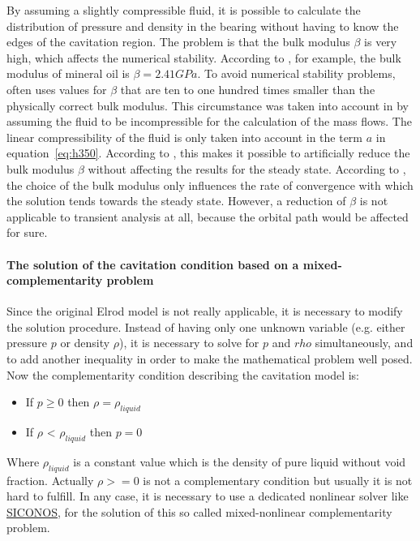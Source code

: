 By assuming a slightly compressible fluid, it is possible to calculate the distribution of pressure and density in the bearing without having to know the edges of the cavitation region. The problem is that the bulk modulus $\beta$ is very high, which affects the numerical stability. According to \cite{Luis-San-Andres-2010}, for example, the bulk modulus of mineral oil is $\beta=2.41GPa$. To avoid numerical stability problems, \cite{Luis-San-Andres-2010} often uses values for $\beta$ that are ten to one hundred times smaller than the physically correct bulk modulus. This circumstance was taken into account in \cite{Elrod-1981} by assuming the fluid to be incompressible for the calculation of the mass flows. The linear compressibility of the fluid is only taken into account in the term $a$ in equation~\ref{eq:h350}. According to \cite{Francisco-2009}, this makes it possible to artificially reduce the bulk modulus $\beta$ without affecting the results for the steady state. According to \cite{Francisco-2009}, the choice of the bulk modulus only influences the rate of convergence with which the solution tends towards the steady state. However, a reduction of $\beta$ is not applicable to transient analysis at all, because the orbital path would be affected for sure.

\paragraph{The solution of the cavitation condition based on a mixed-complementarity problem}
Since the original Elrod model is not really applicable, it is necessary to modify the solution procedure. Instead of having only one unknown variable (e.g. either pressure $p$ or density $\rho$), it is necessary to solve for $p$ and $rho$ simultaneously, and to add another inequality in order to make the mathematical problem well posed.
Now the complementarity condition describing the cavitation model is:
\begin{itemize}
\item If $p \geq 0$ then $\rho = \rho_{liquid}$
\item If $\rho$ < $\rho_{liquid}$ then $p = 0$
\end{itemize}
Where $\rho_{liquid}$ is a constant value which is the density of pure liquid without void fraction. Actually $\rho >= 0$ is not a complementary condition but usually it is not hard to fulfill. In any case, it is necessary to use a dedicated nonlinear solver like \href{https://github.com/siconos/siconos}{SICONOS}, for the solution of this so called mixed-nonlinear complementarity problem.


